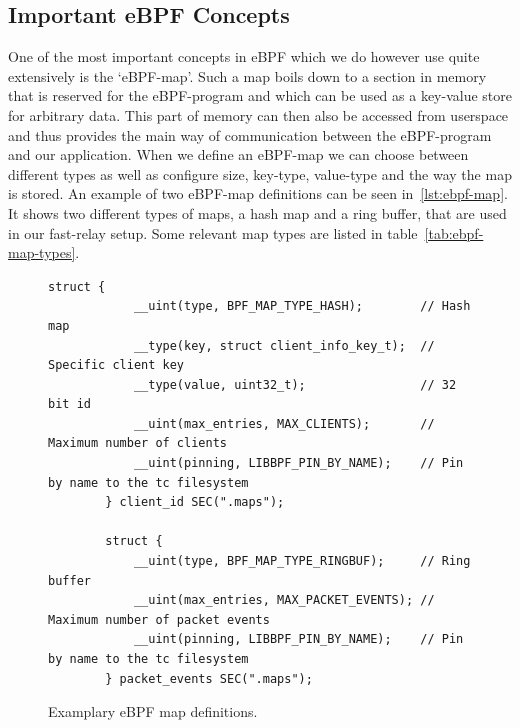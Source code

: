 \subsection{Important eBPF Concepts}
One of the most important concepts in eBPF which we do however use quite extensively is 
the `eBPF-map'.
Such a map boils down to a section in memory that is reserved for the eBPF-program
and which can be used as a key-value store for arbitrary data.
This part of memory can then also be accessed from userspace and thus provides the main 
way of communication between the eBPF-program and our application.
When we define an eBPF-map we can choose between different types as well as configure
size, key-type, value-type and the way the map is stored. %
An example of two eBPF-map definitions can be seen in~\autoref{lst:ebpf-map}.
It shows two different types of maps, a hash map and a ring buffer, that are used in
our fast-relay setup.
Some relevant map types are listed in table~\autoref{tab:ebpf-map-types}.


\begin{figure}[htbp]
    \begin{lstlisting}[style=CStyle]
        struct {
            __uint(type, BPF_MAP_TYPE_HASH);        // Hash map
            __type(key, struct client_info_key_t);  // Specific client key
            __type(value, uint32_t);                // 32 bit id
            __uint(max_entries, MAX_CLIENTS);       // Maximum number of clients
            __uint(pinning, LIBBPF_PIN_BY_NAME);    // Pin by name to the tc filesystem
        } client_id SEC(".maps");

        struct {
            __uint(type, BPF_MAP_TYPE_RINGBUF);     // Ring buffer
            __uint(max_entries, MAX_PACKET_EVENTS); // Maximum number of packet events
            __uint(pinning, LIBBPF_PIN_BY_NAME);    // Pin by name to the tc filesystem
        } packet_events SEC(".maps");
    \end{lstlisting}
    \caption{Examplary eBPF map definitions.}\label{lst:ebpf-map}
\end{figure}

\FloatBarrier

